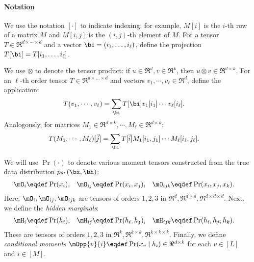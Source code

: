 \paragraph{Notation}

We use the notation $[\cdot]$ to indicate indexing; for example, $M[i]$
  is the $i$-th row of a matrix $M$ and $M[i,j]$ is the $(i,j)$-th element
  of $M$.
For a tensor $T \in \Re^{d \times \cdots \times d}$ and a vector $\bi
  = (i_1, \ldots, i_\ell)$, define the projection $T[\bi] = T[i_1, \ldots, i_\ell]$.

We use $\otimes$ to denote the tensor product: if $u \in \Re^d,
  v \in \Re^k$, then $u \otimes v \in \Re^{d \times k}$.
For an $\ell$-th order tensor $T \in \Re^{d \times \ldots \times
  d}$ and vectors $v_1, \cdots, v_\ell \in \Re^{d}$, define 
  the application:
\begin{align*}
  T(v_1, \cdots, v_\ell) 
  &= \sum_{\bi}
            T[\bi] v_1[i_1] \cdots v_\ell[i_\ell].
\end{align*}
Analogously, for matrices $M_1 \in \Re^{d \times k}, \cdots,
  M_\ell \in \Re^{d \times k}$:
\begin{align*}
  T(M_1, \cdots, M_\ell)[\vec j]
  &= \sum_{\bi} T[\vec i] {M_1}[i_1,j_1] \cdots M_\ell[i_\ell, j_\ell].
\end{align*}

We will use $\Pr(\cdot)$ to denote various moment tensors
constructed from the true data distribution $p_{\theta^*}(\bx,\bh)$:
\begin{align*}
  \mO_i &\eqdef \Pr(x_i), &
  \mO_{ij} &\eqdef \Pr(x_i, x_j), &
  \mO_{ijk} &\eqdef \Pr(x_i, x_j, x_k).
\end{align*}
Here, $\mO_i, \mO_{ij}, \mO_{ijk}$ are tensors of
  orders $1, 2, 3$ in $\Re^d, \Re^{d\times d}, \Re^{d \times d \times d}$.
Next, we define the \emph{hidden marginals}:
\begin{align*}
  \mH_i &\eqdef \Pr(h_i), &
  \mH_{ij} &\eqdef \Pr(h_i, h_j), &
  \mH_{ijk} &\eqdef \Pr(h_i, h_j, h_k).
\end{align*}
These are tensors of
  orders $1, 2, 3$ in $\Re^k, \Re^{k\times k}, \Re^{k \times k \times k}$.
  Finally, we define \emph{conditional moments} $\mOpp{v}{i} \eqdef \Pr(x_v \mid h_i) \in \Re^{d \times k}$
  for each $v \in [L]$ and $i \in [M]$.

